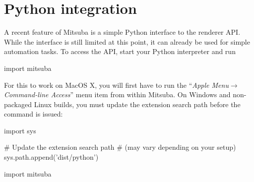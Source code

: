 \section{Python integration}
\label{sec:python}
A recent feature of Mitsuba is a simple Python interface to the renderer API. 
While the interface is still limited at this point, it can already be
used for simple automation tasks. To access the API, start your Python 
interpreter and run
\begin{python}
import mitsuba
\end{python}
For this to work on MacOS X, you will first have to run the ``\emph{Apple
Menu}$\to$\emph{Command-line Access}'' menu item from within Mitsuba.
On Windows and non-packaged Linux builds, you must update the extension
search path before the  command is issued:
\begin{python}
import sys

# Update the extension search path
# (may vary depending on your setup)
sys.path.append('dist/python')

import mitsuba
\end{python}

